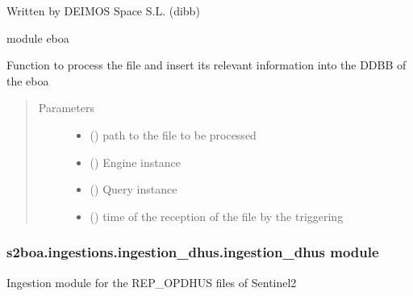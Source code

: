 Written by DEIMOS Space S.L. (dibb)

module eboa

\begin{fulllineitems}
\label{\detokenize{s2boa.ingestions:s2boa.ingestions.ingestion_dfep_schedule.ingestion_dfep_schedule.process_file}}
Function to process the file and insert its relevant information
into the DDBB of the eboa
\begin{quote}\begin{description}
\item[{Parameters}] \leavevmode\begin{itemize}
\item {} 
 () \textendash{} path to the file to be processed

\item {} 
 () \textendash{} Engine instance

\item {} 
 () \textendash{} Query instance

\item {} 
 () \textendash{} time of the reception of the file by the triggering

\end{itemize}

\end{description}\end{quote}

\end{fulllineitems}



\subsubsection{s2boa.ingestions.ingestion\_dhus.ingestion\_dhus module}
\label{\detokenize{s2boa.ingestions:module-s2boa.ingestions.ingestion_dhus.ingestion_dhus}}\label{\detokenize{s2boa.ingestions:s2boa-ingestions-ingestion-dhus-ingestion-dhus-module}}
Ingestion module for the REP\_OPDHUS files of Sentinel\sphinxhyphen{}2

